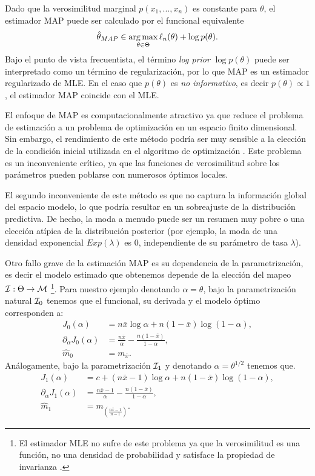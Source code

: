 Dado que la verosimilitud marginal \(p(x_1,...,x_n)\) es constante para \(\theta\), el estimador MAP puede ser calculado por el funcional equivalente
\begin{align*}
	\hat\theta_{MAP} \in \operatorname*{\arg\max}_{\theta \in \Theta} \ell_n(\theta) + \log p(\theta).
\end{align*}
Bajo el punto de vista frecuentista, el término \emph{log prior} \(\log p(\theta)\) puede ser interpretado como un término de regularización, por lo que MAP es un estimador regularizado de MLE. En el caso que \(p(\theta)\) es \emph{no informativo}, es decir \(p(\theta) \propto 1\), el estimador MAP coincide con el MLE.

El enfoque de MAP es computacionalmente atractivo ya que reduce el problema de estimación a un problema de optimización en un espacio finito dimensional. Sin embargo, el rendimiento de este método podría ser muy sensible a la elección de la condición inicial utilizada en el algoritmo de optimización \cite{wright1999numerical}. Este problema es un inconveniente crítico, ya que las funciones de verosimilitud sobre los parámetros pueden poblarse con numerosos óptimos locales. 

El segundo inconveniente de este método es que no captura la información global del espacio modelo, lo que podría resultar en un sobreajuste de la distribución predictiva. De hecho, la moda a menudo puede ser un resumen muy pobre o una elección atípica de la distribución posterior (por ejemplo, la moda de una densidad exponencial \(Exp(\lambda)\) es \(0\), independiente de su parámetro de tasa \(\lambda\)). 

Otro fallo grave de la estimación MAP es su dependencia de la parametrización, es decir el modelo estimado que obtenemos depende de la elección del mapeo \(\mathcal{I}:\Theta \to \mathcal{M}\) \cite{murphybook2012}\footnote{El estimador MLE no sufre de este problema ya que la verosimilitud es una función, no una densidad de probabilidad y satisface la propiedad de invarianza \cite[Theorem 7.2.1]{mukhopadhyay2000probability}. }. Para nuestro ejemplo denotando \(\alpha = \theta\), bajo la parametrización natural \(\mathcal{I}_0\) tenemos que el funcional, su derivada y el modelo óptimo corresponden a:
\begin{align*}
	J_0(\alpha) &= n\bar{x}\log \alpha + n(1-\bar{x})\log(1-\alpha), \\
	\partial_\alpha J_0(\alpha) &= \frac{n\bar{x}}{\alpha} - \frac{n(1-\bar{x})}{1-\alpha}, \\
	\hat{m}_0 &= m_{\bar{x}}.
\end{align*}
Análogamente, bajo la parametrización \(\mathcal{I}_1\) y denotando \(\alpha = \theta^{1/2}\) tenemos que.
\begin{align*}
	J_1(\alpha) &= c + (n\bar{x} -1)\log \alpha + n(1-\bar{x})\log(1-\alpha),\\
	\partial_\alpha J_1(\alpha) &= \frac{n\bar{x}-1}{\alpha} - \frac{n(1-\bar{x})}{1-\alpha},\\
	\hat m_1 &= m_{\left(\frac{n\bar{x}-1}{n-1}\right)}.
\end{align*}


